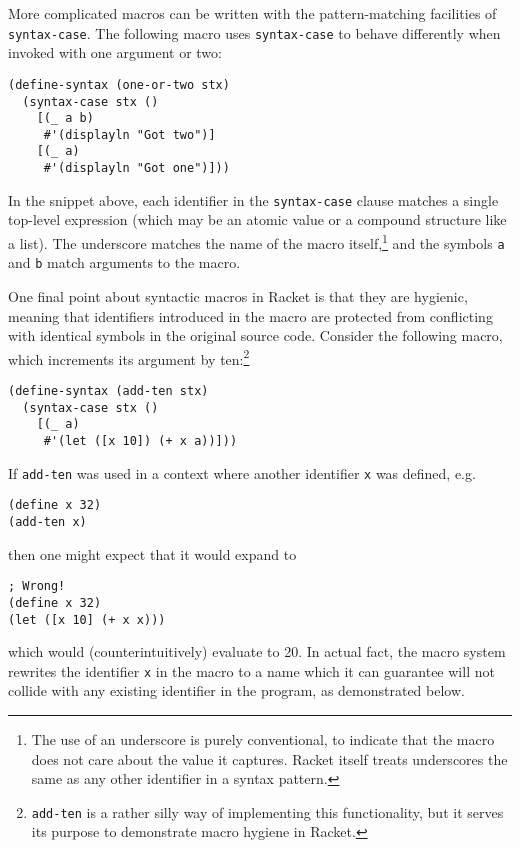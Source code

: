 \documentclass{article}
\begin{document}
More complicated macros can be written with the pattern-matching facilities of \texttt{syntax-case}. The following macro uses \texttt{syntax-case} to behave differently when invoked with one argument or two:

\begin{lstlisting}
(define-syntax (one-or-two stx)
  (syntax-case stx ()
    [(_ a b)
     #'(displayln "Got two")]
    [(_ a)
     #'(displayln "Got one")]))
\end{lstlisting}

In the snippet above, each identifier in the \texttt{syntax-case} clause matches a single top-level expression (which may be an atomic value or a compound structure like a list). The underscore matches the name of the macro itself,\footnote{The use of an underscore is purely conventional, to indicate that the macro does not care about the value it captures. Racket itself treats underscores the same as any other identifier in a syntax pattern.} and the symbols \texttt{a} and \texttt{b} match arguments to the macro.

One final point about syntactic macros in Racket is that they are hygienic, meaning that identifiers introduced in the macro are protected from conflicting with identical symbols in the original source code. Consider the following macro, which increments its argument by ten:\footnote{\texttt{add-ten} is a rather silly way of implementing this functionality, but it serves its purpose to demonstrate macro hygiene in Racket.}

\begin{lstlisting}
(define-syntax (add-ten stx)
  (syntax-case stx ()
    [(_ a)
     #'(let ([x 10]) (+ x a))]))
\end{lstlisting}

If \texttt{add-ten} was used in a context where another identifier \texttt{x} was defined, e.g.

\begin{lstlisting}
(define x 32)
(add-ten x)
\end{lstlisting}

then one might expect that it would expand to

\begin{lstlisting}
; Wrong!
(define x 32)
(let ([x 10] (+ x x)))
\end{lstlisting}

which would (counterintuitively) evaluate to 20. In actual fact, the macro system rewrites the identifier \texttt{x} in the macro to a name which it can guarantee will not collide with any existing identifier in the program, as demonstrated below.
\end{document}
